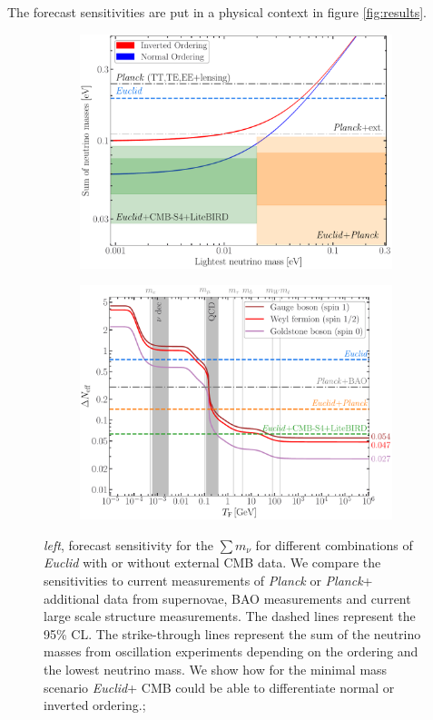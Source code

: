 \documentclass[a4paper,11pt]{article}
\newcommand{\euclid}{\textit{Euclid}\xspace}
\newcommand{\planck}{\textit{Planck}\xspace}
\newcommand{\summnu}{\sum m_\nu}
\begin{document}
The forecast sensitivities are put in a physical context in figure \ref{fig:results}.

\begin{figure}[!htbp]
    \centering
    \begin{subfigure}{0.49\textwidth}
        \centering
        \includegraphics[width=\linewidth]{figure_hierarchy-1.pdf}
    \end{subfigure}
    \hfill
    \begin{subfigure}{0.49\textwidth}
        \centering
        \includegraphics[width=\linewidth]{figure_Neff-1.pdf}
    \end{subfigure}
    \caption{\textit{left}, forecast sensitivity for the $\summnu$ for different combinations of \euclid with or without external CMB data. We compare the sensitivities to current measurements of \planck or \planck + additional data from supernovae, BAO measurements and current large scale structure measurements. The dashed lines represent the 95\% CL. The strike-through lines represent the sum of the neutrino masses from oscillation experiments depending on the ordering and the lowest neutrino mass. We show how for the minimal mass scenario \euclid + CMB could be able to differentiate normal or inverted ordering.;\\
}
\end{figure}
\end{document}
